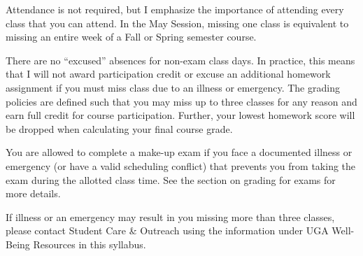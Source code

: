 Attendance is not required, but I emphasize the importance of attending every class that you can attend. In the May Session, missing one class is equivalent to missing an entire week of a Fall or Spring semester course.

There are no ``excused'' absences for non-exam class days. In practice, this means that I will not award participation credit or excuse an additional homework assignment if you must miss class due to an illness or emergency. The grading policies are defined such that you may miss up to three classes for any reason and earn full credit for course participation. Further, your lowest homework score will be dropped when calculating your final course grade.

You are allowed to complete a make-up exam if you face a documented illness or emergency (or have a valid scheduling conflict) that prevents you from taking the exam during the allotted class time. See the section on grading for exams for more details.

If illness or an emergency may result in you missing more than three classes, please contact Student Care \& Outreach using the information under UGA Well-Being Resources in this syllabus.
